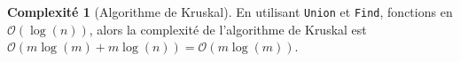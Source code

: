 \documentclass[11pt,english,french]{scrreprt}
\theoremstyle{remark}
\theoremstyle{definition}
\newtheorem*{comp*}{Complexité}
\begin{document}
\begin{algorithm}[H]
	\DontPrintSemicolon
	\caption{Algorithme de Kruskal}
\end{algorithm}

\begin{comp*}[Algorithme de Kruskal]
	En utilisant \lstinline!Union! et \lstinline!Find!, fonctions en $\mathcal{O}(\log(n))$, alors la complexité de l'algorithme de Kruskal est $\mathcal{O}(m\log(m)+m\log(n))=\mathcal{O}(m\log(m))$.
\end{comp*}
\end{document}
